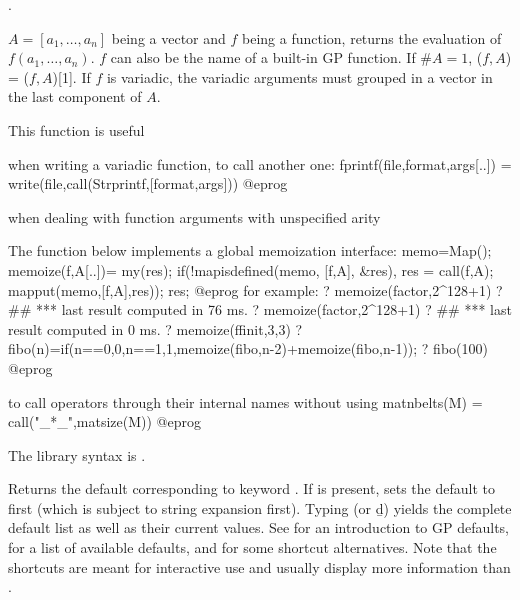 .

\label{se:call}
$A=[a_1,\dots, a_n]$ being a vector and $f$ being a function, returns the
evaluation of $f(a_1,\dots,a_n)$.
$f$ can also be the name of a built-in GP function.
If $\# A =1$, ($f,A$) = ($f,A$)[1].
If $f$ is variadic, the variadic arguments must grouped in a vector in
the last component of $A$.

This function is useful

\item when writing a variadic function, to call another one:
\bprog
fprintf(file,format,args[..]) = write(file,call(Strprintf,[format,args]))
@eprog

\item when dealing with function arguments with unspecified arity

The function below implements a global memoization interface:
\bprog
memo=Map();
memoize(f,A[..])=
{
  my(res);
  if(!mapisdefined(memo, [f,A], &res),
    res = call(f,A);
    mapput(memo,[f,A],res));
 res;
}
@eprog
for example:
\bprog
? memoize(factor,2^128+1)
? ##
  ***   last result computed in 76 ms.
? memoize(factor,2^128+1)
? ##
  ***   last result computed in 0 ms.
? memoize(ffinit,3,3)
? fibo(n)=if(n==0,0,n==1,1,memoize(fibo,n-2)+memoize(fibo,n-1));
? fibo(100)
@eprog

\item to call operators through their internal names without using
\bprog
matnbelts(M) = call("_*_",matsize(M))
@eprog

The library syntax is .

\label{se:default}
Returns the default corresponding to keyword . If  is
present, sets the default to  first (which is subject to string
expansion first). Typing  (or \b{d}) yields the complete
default list as well as their current values. See  for an
introduction to GP defaults,  for a
list of available defaults, and  for some shortcut
alternatives. Note that the shortcuts are meant for interactive use and
usually display more information than .

